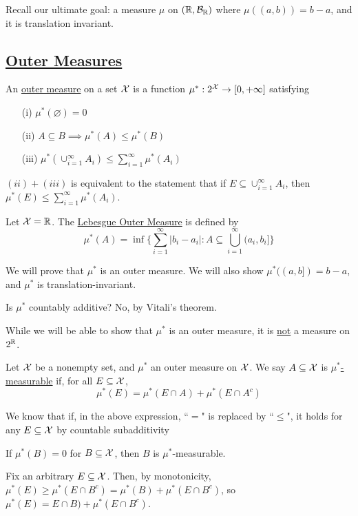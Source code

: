 \documentclass[x11names,reqno,14pt]{extarticle}
\newcommand*{\oo}{\infty}
\newcommand{\seq}[1]{_{#1 = 1}^\oo}
\begin{document}
Recall our ultimate goal: a measure $\mu$ on $(\mathbb{R},\mathcal{B}_{\mathbb{R}})$ where $\mu((a, b)) = b - a$, and it is translation invariant.

\subsection*{\underline{Outer Measures}}


An \underline{outer measure} on a set $\mathcal{X}$ is a function $\mu^*:2^\mc{X}\to[0,+\oo]$ satisfying
\begin{itemize}
\item[(i)] $\mu^*(\varnothing) = 0$
\item[(ii)] $A \subseteq B \implies \mu^*(A)\leq\mu^*(B)$
\item[(iii)] $\mu^*(\cup\seq{i}A_i)\leq\sum\seq{i}\mu^*(A_i)$
\end{itemize}

\rem $(ii) + (iii)$ is equivalent to the statement that if $E\subseteq\cup\seq{i}A_i$, then $\mu^*(E) \leq \sum\seq{i}\mu^*(A_i)$. 

\exm

Let $\mathcal{X} = \mathbb{R}$. The \underline{Lebesgue Outer Measure} is defined by 
\[
\mu^*(A) = \inf\{\sum\seq{i}|b_i - a_i| : A\subseteq \bigcup\seq{i}(a_i, b_i]\}
\]

We will prove that $\mu^*$ is an outer measure. We will also show $\mu^*((a, b]) = b - a$, and $\mu^*$ is translation-invariant. 

Is $\mu^*$ countably additive? No, by Vitali's theorem. 

While we will be able to show that $\mu^*$ is an outer measure, it is \underline{not} a measure on $2^{\mathbb{R}}$. 


Let $\mathcal{X}$ be a nonempty set, and $\mu^*$ an outer measure on $\mathcal{X}$. We say $A \subseteq \mathcal{X}$ is \underline{$\mu^*$-measurable} if, for all $E\subseteq \mathcal{X}$, 
\[
\mu^*(E) = \mu^*(E \cap A) + \mu^*(E \cap A^c)
\]

\rem 

We know that if, in the above expression, ``$=$" is replaced by ``$\leq$", it holds for any $E\subseteq \mathcal{X}$ by countable subadditivity

\prop 

If $\mu^*(B) = 0$ for $B\subseteq \mathcal{X}$, then $B$ is $\mu^*$-measurable. 

\proof

Fix an arbitrary $E\subseteq \mathcal{X}$. Then, by monotonicity, $\mu^*(E) \geq \mu^*(E\cap B^c) = \mu^*(B) + \mu^*(E\cap B^c)$, so $\mu^*(E) = E\cap B) + \mu^*(E \cap B^c)$. 
\end{document}
